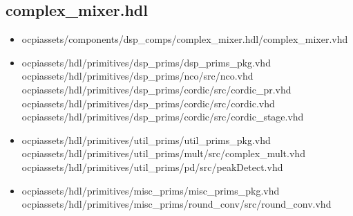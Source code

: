 \documentclass{article}
\def\comp{complex\_mixer}
\begin{document}
\subsection*{\comp.hdl}
\begin{itemize}
	\item ocpiassets/components/dsp\_comps/complex\_mixer.hdl/complex\_mixer.vhd
	\item ocpiassets/hdl/primitives/dsp\_prims/dsp\_prims\_pkg.vhd
	      \subitem ocpiassets/hdl/primitives/dsp\_prims/nco/src/nco.vhd
	      \subitem ocpiassets/hdl/primitives/dsp\_prims/cordic/src/cordic\_pr.vhd
	      \subitem ocpiassets/hdl/primitives/dsp\_prims/cordic/src/cordic.vhd
	      \subitem ocpiassets/hdl/primitives/dsp\_prims/cordic/src/cordic\_stage.vhd
	\item ocpiassets/hdl/primitives/util\_prims/util\_prims\_pkg.vhd
	      \subitem ocpiassets/hdl/primitives/util\_prims/mult/src/complex\_mult.vhd
	      \subitem ocpiassets/hdl/primitives/util\_prims/pd/src/peakDetect.vhd
	\item ocpiassets/hdl/primitives/misc\_prims/misc\_prims\_pkg.vhd
	      \subitem ocpiassets/hdl/primitives/misc\_prims/round\_conv/src/round\_conv.vhd
\end{itemize}
\end{document}
